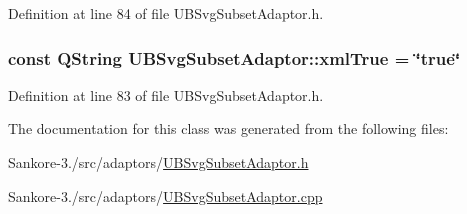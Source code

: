 Definition at line 84 of file U\-B\-Svg\-Subset\-Adaptor.\-h.

\hypertarget{class_u_b_svg_subset_adaptor_ad5460226f2e1c56cd3b7db062fe7c0da}{
\subsubsection[{xml\-True}]{\setlength{\rightskip}{0pt plus 5cm}const Q\-String U\-B\-Svg\-Subset\-Adaptor\-::xml\-True = \char`\"{}true\char`\"{}\hspace{0.3cm}{\ttfamily [static]}}}\label{d3/df9/class_u_b_svg_subset_adaptor_ad5460226f2e1c56cd3b7db062fe7c0da}


Definition at line 83 of file U\-B\-Svg\-Subset\-Adaptor.\-h.



The documentation for this class was generated from the following files\-:\begin{DoxyCompactItemize}
\item 
Sankore-\/3./src/adaptors/\hyperlink{_u_b_svg_subset_adaptor_8h}{U\-B\-Svg\-Subset\-Adaptor.\-h}\item 
Sankore-\/3./src/adaptors/\hyperlink{_u_b_svg_subset_adaptor_8cpp}{U\-B\-Svg\-Subset\-Adaptor.\-cpp}\end{DoxyCompactItemize}
